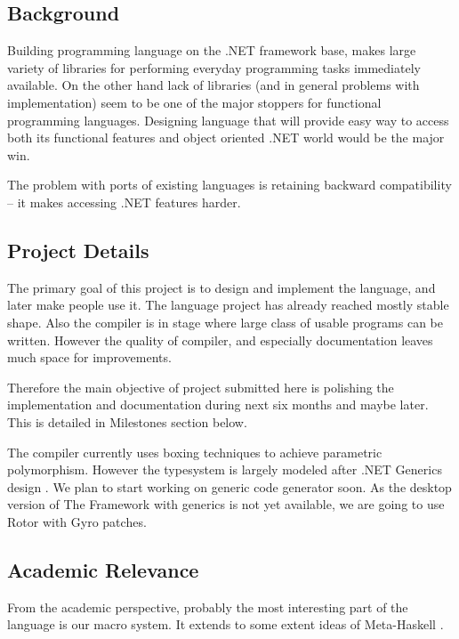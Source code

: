\documentclass[a4paper,11pt]{article}
\begin{document}
\subsection{Background}
Building programming language on the .NET framework base, makes large
variety of libraries for performing everyday programming tasks immediately
available. On the other hand lack of libraries (and in general problems
with implementation) seem to be one of the major stoppers for functional
programming languages. Designing language that will provide easy way
to access both its functional features and object oriented .NET world
would be the major win.

The problem with ports of existing languages is retaining backward
compatibility -- it makes accessing .NET features harder.


\subsection{Project Details}

The primary goal of this project is to design and implement the language,
and later make people use it. The language project has already reached
mostly stable shape. Also the compiler is in stage where large class of
usable programs can be written. However the quality of compiler, and
especially documentation leaves much space for improvements.

Therefore the main objective of project submitted here is polishing the
implementation and documentation during next six months and maybe later.
This is detailed in Milestones section below.

The compiler currently uses boxing techniques to achieve parametric
polymorphism.  However the typesystem is largely modeled after .NET
Generics design \cite{generics}. We plan to start working on generic code
generator soon. As the desktop version of The Framework with generics
is not yet available, we are going to use Rotor with Gyro patches.


\subsection{Academic Relevance}

From the academic perspective, probably the most interesting part of
the language is our macro system. It extends to some extent
ideas of Meta-Haskell \cite{MetaHaskell}.

\end{document}
